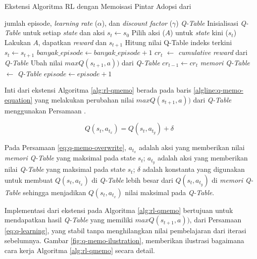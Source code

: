 \begin{algorithm}
	\makeatletter
	\renewcommand{\ALG@name}{Algoritma}
	\makeatother
	\caption{Ekstensi Algoritma \ac{RL} dengan Memoisasi Pintar Adopsi dari \parencite{mazaya2024reinforcement}}\label{alg:rl-qmemo}
	\renewcommand{\algorithmicrequire}{\textbf{Masukan:}}
	\renewcommand{\algorithmicensure}{\textbf{Keluaran:}}
	\begin{algorithmic}[1]
		\Require jumlah episode, \textit{learning rate} ($\alpha$), dan \textit{discount factor} ($\gamma$)
		\Ensure \textit{Q-Table}
		\State Inisialisasi \textit{Q-Table} untuk setiap \textit{state} dan aksi
		\State $s_{t} \gets s_0$
		\State Pilih aksi ($A$) untuk \textit{state} kini ($s_t$)
		\State Lakukan $A$, dapatkan \textit{reward} dan $s_{t+1}$
		\State Hitung nilai Q-Table indeks terkini 
		\State $s_t \gets s_{t+1}$
		\EndWhile
		\State $banyak\_episode \gets banyak\_episode + 1$
		\State $cr_t$ $\gets$ \textit{cumulative reward} dari \textit{Q-Table}
		\State Ubah nilai $maxQ(s_{t+1},a))$ dari \textit{Q-Table} \label{algline:q-memo-equation} 
		\EndIf
		\State $cr_{t-1} \gets cr_t$
		\State \textit{memori Q-Table} $\gets$ \textit{Q-Table}
		\State $episode \gets episode + 1$
		\EndWhile
	\end{algorithmic}
\end{algorithm}

Inti dari ekstensi Algoritma \ref{alg:rl-qmemo} berada pada baris \ref{algline:q-memo-equation} yang melakukan perubahan nilai $maxQ(s_{t+1},a))$ dari \textit{Q-Table} menggunakan Persamaan .

\begin{equation}
	\label{eq:q-memo-overwrite}
	Q(s_{t},a_{t_x}) =	Q(s_{t},a_{t_y}) + \delta
\end{equation}

Pada Persamaan \ref{eq:q-memo-overwrite}, \(a_{t_x}\) adalah aksi yang memberikan nilai \textit{memori Q-Table} yang maksimal pada state $s_t$; \(a_{t_y}\) adalah aksi yang memberikan nilai \textit{Q-Table} yang maksimal pada state $s_t$; \(\delta\) adalah konstanta yang digunakan untuk membuat \(Q(s_{t},a_{t_x})\) di \textit{Q-Table} lebih besar dari \(Q(s_{t},a_{t_y})\) di \textit{memori Q-Table} sehingga menjadikan \(Q(s_{t},a_{t_x})\) nilai maksimal pada \textit{Q-Table}.

Implementasi dari ekstensi pada Algoritma \ref{alg:rl-qmemo} bertujuan untuk mendapatkan hasil \textit{Q-Table} yang memiliki $maxQ(s_{t+1},a))$, dari Persamaan \ref{eq:q-learning}, yang stabil tanpa menghilangkan nilai pembelajaran dari iterasi sebelumnya. Gambar \ref{fig:q-memo-ilustration}, memberikan ilustrasi bagaimana cara kerja Algoritma \ref{alg:rl-qmemo} secara detail.

